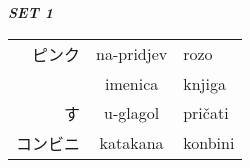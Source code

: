 \documentclass{grampig}
\begin{document}
	\parbox{6cm}{
	\pagecolor{maroon}
	\color{lime}
	\centering
	{\color{lime} \textbf{\textit{SET 1}}} \br
	
	\begin{tabular}{RCl}
		ピンク & na-pridjev & rozo \\
		 & imenica & knjiga \\
		す & u-glagol & pričati \\
		コンビニ & katakana & konbini \\
	\end{tabular}
}
\end{document}
